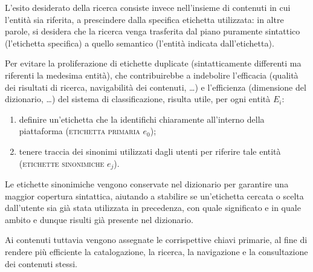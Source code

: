 \documentclass[10pt,a4paper,headinclude,footinclude,hidelinks]{scrreprt} %
\begin{document}

	L'esito desiderato della ricerca consiste invece nell'insieme di contenuti in cui l'entità sia riferita, a prescindere dalla specifica etichetta utilizzata: in altre parole, si desidera che la ricerca venga trasferita dal piano puramente sintattico (l'etichetta specifica) a quello semantico (l'entità indicata dall'etichetta).

	Per evitare la proliferazione di etichette duplicate (sintatticamente differenti ma riferenti la medesima entità), che contribuirebbe a indebolire l'efficacia (qualità dei risultati di ricerca, navigabilità dei contenuti, \ldots) e l'efficienza (dimensione del dizionario, \ldots) del sistema di classificazione, risulta utile, per ogni entità $E_i$:
	\begin{enumerate}
	\item definire un'etichetta che la identifichi chiaramente all'interno della piattaforma (\textsc{etichetta primaria} $e_0$);
	\item tenere traccia dei sinonimi utilizzati dagli utenti per riferire tale entità (\textsc{etichette sinonimiche} $e_j$).
	\end{enumerate}


	Le etichette sinonimiche vengono conservate nel dizionario per garantire una maggior copertura sintattica, aiutando a stabilire se un'etichetta cercata o scelta dall'utente sia già stata utilizzata in precedenza, con quale significato e in quale ambito e dunque risulti già presente nel dizionario.

	Ai contenuti tuttavia vengono assegnate le corrispettive chiavi primarie, al fine di rendere più efficiente la catalogazione, la ricerca, la navigazione e la consultazione dei contenuti stessi.
\end{document}

